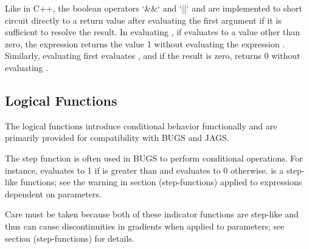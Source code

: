 \begin{description}
{Like in  C++, the boolean operators `&&` and `||` and are implemented to short circuit directly to a return value after evaluating the first argument if it is sufficient to resolve the result.  In evaluating , if  evaluates to a value other than zero, the expression returns the value 1 without evaluating the expression .  Similarly, evaluating  first evaluates , and if the result is zero, returns 0 without evaluating .


\subsection{Logical Functions}


The logical functions introduce conditional behavior functionally and are primarily provided for compatibility with BUGS and JAGS.


\begin{description}    \end{description}


The step function is often used in BUGS to perform conditional operations.  For instance,  evaluates to 1 if  is greater than  and evaluates to 0 otherwise.  is a step-like functions; see the warning in section \@ref(step-functions) applied to expressions dependent on parameters.


\begin{description}    \end{description}


\begin{description}    \end{description}


Care must be taken because both of these indicator functions are step-like and thus can cause discontinuities in gradients when applied to parameters; see section \@ref(step-functions) for details.


}
\end{description}
